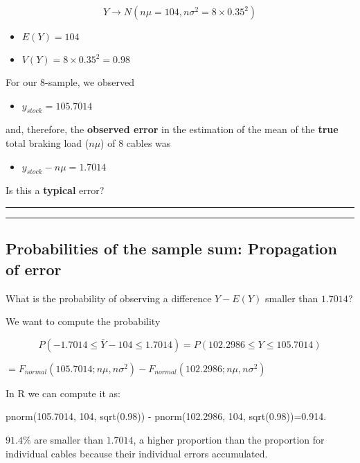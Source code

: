 \documentclass[
]{book}
\providecommand{\tightlist}{%
  \setlength{\itemsep}{0pt}\setlength{\parskip}{0pt}}
\begin{document}
\[Y \rightarrow N(n\mu=104, n\sigma^2=8\times 0.35^2)\]

\begin{itemize}
\tightlist
\item
  \(E(Y)=104\)
\item
  \(V(Y)=8\times 0.35^2=0.98\)
\end{itemize}

For our \(8\)-sample, we observed

\begin{itemize}
\tightlist
\item
  \(y_{stock}=105.7014\)
\end{itemize}

and, therefore, the \textbf{observed error} in the estimation of the mean of the \textbf{true} total braking load (\(n\mu\)) of \(8\) cables was

\begin{itemize}
\tightlist
\item
  \(y_{stock}-n\mu= 1.7014\)
\end{itemize}

Is this a \textbf{typical} error?

\begin{center}\rule{0.5\linewidth}{0.5pt}\end{center}

\begin{center}\rule{0.5\linewidth}{0.5pt}\end{center}

\hypertarget{probabilities-of-the-sample-sum-propagation-of-error}{%
\subsection{Probabilities of the sample sum: Propagation of error}\label{probabilities-of-the-sample-sum-propagation-of-error}}

What is the probability of observing a difference \(Y-E(Y)\) smaller than \(1.7014\)?

We want to compute the probability

\[P(-1.7014 \leq \bar{Y} - 104 \leq 1.7014)=P(102.2986 \leq Y \leq 105.7014)\]

\(=F_{normal}(105.7014; n\mu, n\sigma^2)-F_{normal}(102.2986; n\mu, n\sigma^2)\)

In R we can compute it as:

pnorm(105.7014, 104, sqrt(0.98)) - pnorm(102.2986, 104, sqrt(0.98))=0.914.

\(91.4\%\) are smaller than \(1.7014\), a higher proportion than the proportion for individual cables because their individual errors accumulated.
\end{document}

